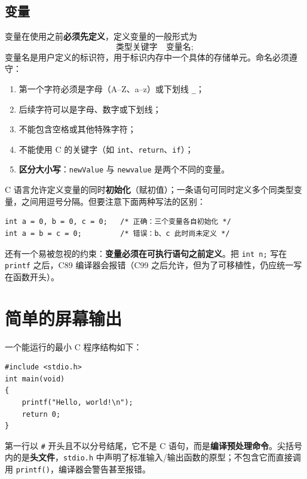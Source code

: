 \subsection{变量}

变量在使用之前\textbf{必须先定义}，定义变量的一般形式为
\[
\text{类型关键字}\quad\text{变量名};
\]
变量名是用户定义的标识符，用于标识内存中一个具体的存储单元。命名必须遵守：

\begin{enumerate}
  \item 第一个字符必须是字母（A--Z、a--z）或下划线 \texttt{\_}；
  \item 后续字符可以是字母、数字或下划线；
  \item 不能包含空格或其他特殊字符；
  \item 不能使用 C 的关键字（如 \texttt{int}、\texttt{return}、\texttt{if}）；
  \item \textbf{区分大小写}：\texttt{newValue} 与 \texttt{newvalue} 是两个不同的变量。
\end{enumerate}

C 语言允许定义变量的同时\textbf{初始化}（赋初值）；一条语句可同时定义多个同类型变量，之间用逗号分隔。但要注意下面两种写法的区别：

\begin{lstlisting}
int a = 0, b = 0, c = 0;   /* 正确：三个变量各自初始化 */
int a = b = c = 0;         /* 错误：b、c 此时尚未定义 */
\end{lstlisting}

还有一个易被忽视的约束：\textbf{变量必须在可执行语句之前定义}。把 \texttt{int n;} 写在 \texttt{printf} 之后，C89 编译器会报错（C99 之后允许，但为了可移植性，仍应统一写在函数开头）。


\section{简单的屏幕输出}

一个能运行的最小 C 程序结构如下：

\begin{lstlisting}
#include <stdio.h>
int main(void)
{
    printf("Hello, world!\n");
    return 0;
}
\end{lstlisting}

第一行以 \texttt{\#} 开头且不以分号结尾，它不是 C 语句，而是\textbf{编译预处理命令}。尖括号内的是\textbf{头文件}，\texttt{stdio.h} 中声明了标准输入/输出函数的原型；不包含它而直接调用 \texttt{printf()}，编译器会警告甚至报错。

